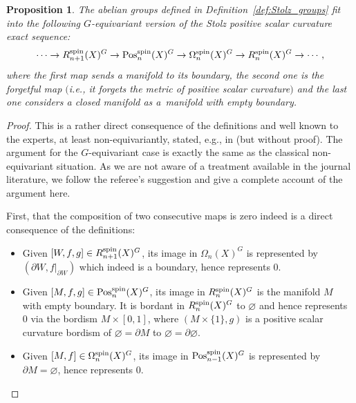 \documentclass[pdftex]{sigma}
\numberwithin{equation}{section}
\newtheorem{Proposition}[Theorem]{Proposition}
{ \theoremstyle{definition}
	\newtheorem{Definition}[Theorem]{Definition}
	\newtheorem{Note}[Theorem]{Note}
	\newtheorem{Example}[Theorem]{Example}
	\newtheorem{Remark}[Theorem]{Remark} }
\newcommand{\boundary}[1]{\partial#1}
\begin{document}
\begin{Proposition}\label{prop:Stolz_seq}
		The abelian groups defined in Definition~{\rm\ref{def:Stolz_groups}} fit into the
		following $G$-equivari\-ant version of the Stolz positive scalar curvature exact sequence:
		\[
			\cdots \to R^{\rm spin}_{n+1}(X)^{G} \to \mathrm{Pos}^{\rm spin}_{n}(X)^{G} \to \Omega^{\rm spin}_{n}(X)^{G} \to R^{\rm spin}_{n}(X)^{G} \to \cdots,
		\]
		where the first map sends a manifold to its boundary, the second one
		is the forgetful map $($i.e., it forgets the metric of positive scalar curvature$)$
		and the last one considers a closed manifold as a~manifold with empty boundary.
	\end{Proposition}
	\begin{proof}
		This is a rather direct consequence of the definitions and well known to the
		experts, at least non-equivariantly, stated, e.g., in \cite[long exact sequence~(4.4)]{Stolz} (but
		without proof). The
		argument for the
		$G$-equivariant case is exactly the same as the classical non-equivariant
		situation. As we are not aware of a treatment available in the journal
		literature, we follow the referee's suggestion and give a complete account
		of the argument here.
		
		First, that the composition of two consecutive maps is zero indeed is a
		direct consequence of the definitions:
		\begin{itemize}\itemsep=0pt
			\item Given $[W,f,g]\in R^{\rm spin}_{n+1}(X)^G$, its image in $\Omega_n(X)^G$ is
			represented by $(\boundary W,f|_{\boundary W})$ which indeed is a boundary, hence represents
			$0$.
			\item Given $[M,f,g]\in \mathrm{Pos}_n^{\rm spin}(X)^G$, its image in $R^{\rm spin}_n(X)^G$ is
			the manifold $M$ with empty boundary. It is bordant in $R^{\rm spin}_n(X)^G$
			to $\varnothing$ and hence represents $0$ via the
			bordism $M\times [0,1]$, where $(M\times \{1\},g)$ is a positive scalar curvature bordism of
			$\varnothing =\boundary M$ to $\varnothing=\boundary\varnothing$.
			\item Given $[M,f]\in \Omega^{\rm spin}_n(X)^G$, its image in
			$\mathrm{Pos}_{n-1}^{\rm spin}(X)^G$ is represented by $\boundary M=\varnothing$, hence
			represents $0$.
		\end{itemize}
		

\end{proof}
\end{document}
